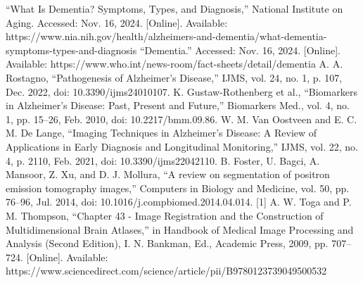 
\begin{thebibliography}{00}
	 “What Is Dementia? Symptoms, Types, and Diagnosis,” National Institute on Aging. Accessed: Nov. 16, 2024. [Online]. Available: https://www.nia.nih.gov/health/alzheimers-and-dementia/what-dementia-symptoms-types-and-diagnosis
	 “Dementia.” Accessed: Nov. 16, 2024. [Online]. Available: https://www.who.int/news-room/fact-sheets/detail/dementia
	 A. A. Rostagno, “Pathogenesis of Alzheimer’s Disease,” IJMS, vol. 24, no. 1, p. 107, Dec. 2022, doi: 10.3390/ijms24010107.
	 K. Gustaw-Rothenberg et al., “Biomarkers in Alzheimer’s Disease: Past, Present and Future,” Biomarkers Med., vol. 4, no. 1, pp. 15–26, Feb. 2010, doi: 10.2217/bmm.09.86.
	 W. M. Van Oostveen and E. C. M. De Lange, “Imaging Techniques in Alzheimer’s Disease: A Review of Applications in Early Diagnosis and Longitudinal Monitoring,” IJMS, vol. 22, no. 4, p. 2110, Feb. 2021, doi: 10.3390/ijms22042110.
	 B. Foster, U. Bagci, A. Mansoor, Z. Xu, and D. J. Mollura, “A review on segmentation of positron emission tomography images,” Computers in Biology and Medicine, vol. 50, pp. 76–96, Jul. 2014, doi: 10.1016/j.compbiomed.2014.04.014.
	 [1] A. W. Toga and P. M. Thompson, “Chapter 43 - Image Registration and the Construction of Multidimensional Brain Atlases,” in Handbook of Medical Image Processing and Analysis (Second Edition), I. N. Bankman, Ed., Academic Press, 2009, pp. 707–724. [Online]. Available: https://www.sciencedirect.com/science/article/pii/B9780123739049500532
\end{thebibliography}





